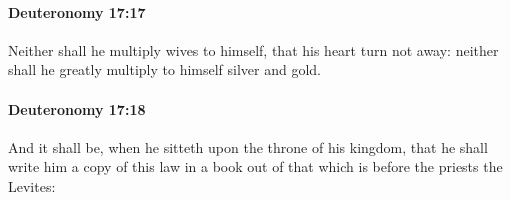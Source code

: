 		\paragraph{Deuteronomy 17:17} %
			\label{DEUTERONOMY-17-17}

			Neither shall he multiply wives to himself, that his heart turn not away: neither shall he greatly multiply to himself silver and gold.


		\paragraph{Deuteronomy 17:18} %
			\label{DEUTERONOMY-17-18}

			And it shall be, when he sitteth upon the throne of his kingdom, that he shall write him a copy of this law in a book out of that which is before the priests the Levites:


